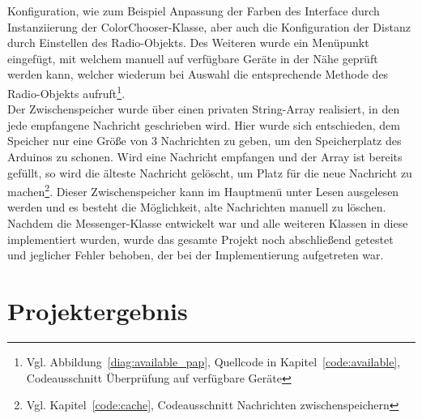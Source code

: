 \documentclass[a4paper, 11pt]{scrartcl}
\begin{document}
Konfiguration, wie zum Beispiel Anpassung der Farben
des Interface durch Instanziierung der \glqq ColorChooser\grqq -Klasse, aber auch die Konfiguration der Distanz durch Einstellen des \glqq Radio\grqq -Objekts.
Des Weiteren wurde ein Menüpunkt eingefügt, mit welchem manuell auf verfügbare Geräte in der Nähe geprüft werden kann, welcher wiederum bei Auswahl die entsprechende Methode
des \glqq Radio\grqq -Objekts 
aufruft\footnote{Vgl. Abbildung~\ref{diag:available_pap}, Quellcode in Kapitel~\ref{code:available}, Codeausschnitt \glqq Überprüfung auf verfügbare Geräte\grqq{}}.
\\
Der Zwischenspeicher wurde über einen privaten String-Array realisiert, in den jede empfangene Nachricht geschrieben wird. Hier wurde sich entschieden, dem Speicher nur
eine Größe von 3 Nachrichten zu geben, um den Speicherplatz des Arduinos zu schonen. Wird eine Nachricht empfangen und der Array ist bereits gefüllt, so wird die älteste Nachricht
gelöscht, um Platz für die neue Nachricht zu machen\footnote{Vgl. Kapitel~\ref{code:cache}, Codeausschnitt \glqq Nachrichten zwischenspeichern\grqq{}}. Dieser Zwischenspeicher
kann im Hauptmenü unter \glqq Lesen\grqq{} ausgelesen werden und es besteht die Möglichkeit, alte Nachrichten manuell zu löschen.
\\
Nachdem die \glqq Messenger\grqq -Klasse entwickelt war und alle weiteren Klassen in diese implementiert wurden, wurde das gesamte Projekt noch abschließend getestet
und jeglicher Fehler behoben, der bei der Implementierung aufgetreten war.


\section{Projektergebnis}
\end{document}
